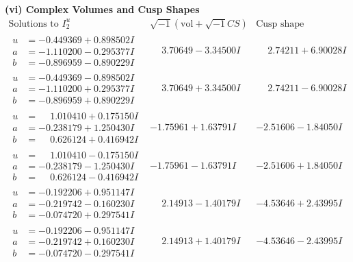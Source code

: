 \documentclass[1p]{elsarticle_modified}
\theoremstyle{definition}
\newcommand{\I}{\sqrt{-1}}
\begin{document}
\newpage\flushleft \textbf{(vi) Complex Volumes and Cusp Shapes}
$$\begin{array}{c|c|c}  
\text{Solutions to }I^u_{2}& \I (\text{vol} + \sqrt{-1}CS) & \text{Cusp shape}\\
 \hline 
\begin{aligned}
u &= -0.449369 + 0.898502 I \\
a &= -1.110200 - 0.295377 I \\
b &= -0.896959 - 0.890229 I\end{aligned}
 & \phantom{-}3.70649 - 3.34500 I & \phantom{-}2.74211 + 6.90028 I \\ \hline\begin{aligned}
u &= -0.449369 - 0.898502 I \\
a &= -1.110200 + 0.295377 I \\
b &= -0.896959 + 0.890229 I\end{aligned}
 & \phantom{-}3.70649 + 3.34500 I & \phantom{-}2.74211 - 6.90028 I \\ \hline\begin{aligned}
u &= \phantom{-}1.010410 + 0.175150 I \\
a &= -0.238179 + 1.250430 I \\
b &= \phantom{-}0.626124 + 0.416942 I\end{aligned}
 & -1.75961 + 1.63791 I & -2.51606 - 1.84050 I \\ \hline\begin{aligned}
u &= \phantom{-}1.010410 - 0.175150 I \\
a &= -0.238179 - 1.250430 I \\
b &= \phantom{-}0.626124 - 0.416942 I\end{aligned}
 & -1.75961 - 1.63791 I & -2.51606 + 1.84050 I \\ \hline\begin{aligned}
u &= -0.192206 + 0.951147 I \\
a &= -0.219742 - 0.160230 I \\
b &= -0.074720 + 0.297541 I\end{aligned}
 & \phantom{-}2.14913 - 1.40179 I & -4.53646 + 2.43995 I \\ \hline\begin{aligned}
u &= -0.192206 - 0.951147 I \\
a &= -0.219742 + 0.160230 I \\
b &= -0.074720 - 0.297541 I\end{aligned}
 & \phantom{-}2.14913 + 1.40179 I & -4.53646 - 2.43995 I \\ \hline\begin{aligned}

\end{aligned}
\end{array}$$
\end{document}
